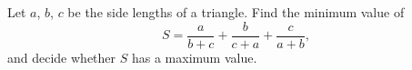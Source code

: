 Let $a$, $b$, $c$ be the side lengths of a triangle. Find the minimum value of
\[
S=\dfrac{a}{b+c}+\dfrac{b}{c+a}+\dfrac{c}{a+b},
\]
and decide whether $S$ has a maximum value.
